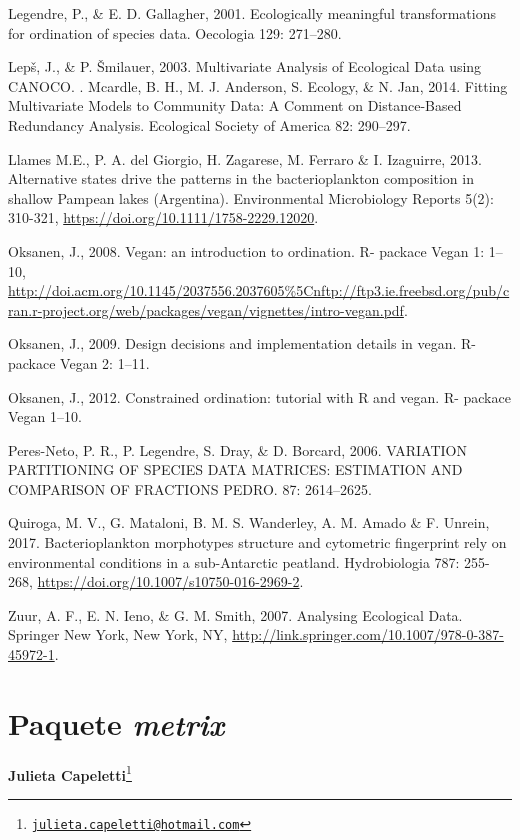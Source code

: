 \documentclass[
]{book}
\begin{document}
Legendre, P., \& E. D. Gallagher, 2001. Ecologically meaningful transformations for ordination of species data. Oecologia 129: 271--280.

Lepš, J., \& P. Šmilauer, 2003. Multivariate Analysis of Ecological Data using CANOCO. .
Mcardle, B. H., M. J. Anderson, S. Ecology, \& N. Jan, 2014. Fitting Multivariate Models to Community Data: A Comment on Distance-Based Redundancy Analysis. Ecological Society of America 82: 290--297.

Llames M.E., P. A. del Giorgio, H. Zagarese, M. Ferraro \& I. Izaguirre, 2013. Alternative states drive the patterns in the bacterioplankton composition in shallow Pampean lakes (Argentina). Environmental Microbiology Reports 5(2): 310-321, \url{https://doi.org/10.1111/1758-2229.12020}.

Oksanen, J., 2008. Vegan: an introduction to ordination. R- packace Vegan 1: 1--10, \url{http://doi.acm.org/10.1145/2037556.2037605\%5Cnftp://ftp3.ie.freebsd.org/pub/cran.r-project.org/web/packages/vegan/vignettes/intro-vegan.pdf}.

Oksanen, J., 2009. Design decisions and implementation details in vegan. R- packace Vegan 2: 1--11.

Oksanen, J., 2012. Constrained ordination: tutorial with R and vegan. R- packace Vegan 1--10.

Peres-Neto, P. R., P. Legendre, S. Dray, \& D. Borcard, 2006. VARIATION PARTITIONING OF SPECIES DATA MATRICES: ESTIMATION AND COMPARISON OF FRACTIONS PEDRO. 87: 2614--2625.

Quiroga, M. V., G. Mataloni, B. M. S. Wanderley, A. M. Amado \& F. Unrein, 2017. Bacterioplankton morphotypes structure and cytometric fingerprint rely on environmental conditions in a sub-Antarctic peatland. Hydrobiologia 787: 255-268, \url{https://doi.org/10.1007/s10750-016-2969-2}.

Zuur, A. F., E. N. Ieno, \& G. M. Smith, 2007. Analysing Ecological Data. Springer New York, New York, NY, \url{http://link.springer.com/10.1007/978-0-387-45972-1}.

\hypertarget{metrix}{%
\chapter{\texorpdfstring{Paquete \emph{metrix}}{Paquete metrix}}\label{metrix}}

\textbf{Julieta Capeletti}\footnote{\href{mailto:julieta.capeletti@hotmail.com}{\nolinkurl{julieta.capeletti@hotmail.com}}}
\end{document}
